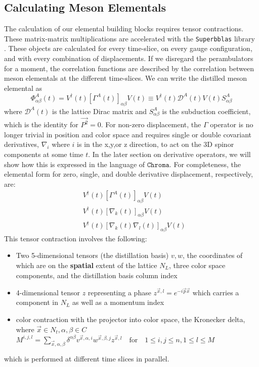 \subsection{Calculating Meson Elementals}
The calculation of our elemental building blocks requires tensor contractions. These matrix-matrix multiplications are accelerated with the \texttt{Superbblas} library \cite{dinapoli2013efficientuseblaslibrary}. These objects are calculated for every time-slice, on every gauge configuration, and with every combination of displacements. If we disregard the perambulators for a moment, the correlation functions are described by the correlation between meson elementals at the different time-slices. We can write the distilled meson elemental as 
\begin{equation}
\Phi^A_{\alpha\beta}(t) = V^{\dagger}(t) [\Gamma^A(t)]_{\alpha\beta} V(t) \equiv V^{\dagger}(t)\mathcal{D}^A(t)V(t)S^A_{\alpha\beta}
\end{equation} where $\mathcal{D}^A(t)$ is the lattice Dirac matrix and $S^A_{\alpha\beta}$ is the subduction coefficient, which is the identity for $\vec{P^2} = 0$.
For non-zero displacement, the $\Gamma$ operator is no longer trivial in position and color space and requires single or double covariant derivatives, $\nabla_i$ where $i$ is in the x,y,or z direction, to act on the 3D spinor components at some time $t$. In the later section on derivative operators, we will show how this is expressed in the language of $\texttt{Chroma}$. For completeness, the elemental form for zero, single, and double derivative displacement, respectively, are: 
\begin{eqnarray}
  & V^{\dagger}(t) [\Gamma^A(t)]_{\alpha\beta} V(t) \\ 
  & V^{\dagger}(t) [\nabla_k(t)]_{\alpha\beta} V(t) \\ 
  & V^{\dagger}(t) [\nabla_k(t)\nabla_l(t)]_{\alpha\beta} V(t)
\end{eqnarray}
This tensor contraction involves the following\cite{romero_efficient_2020}: 
\begin{itemize}
  \item Two 5-dimensional tensors (the distillation basis) $v,w$, the coordinates of which are on the \textbf{spatial} extent of the lattice $N_L$, three color space components, and the distillation basis column index 
  \item  4-dimensional tensor $z$ representing a phase $z^{\vec{x},l} = e^{-i\vec{p}\vec{x}}$ which carries a component in $N_L$ as well as a momentum index
  \item color contraction with the projector into color space, the Kronecker delta, where $\vec{x}\in N_t,\alpha,\beta \in C$
  \subitem $ M^{i,j,l} = \sum_{\vec{x},\alpha,\beta} \delta^{\alpha\beta} v^{\vec{x},\alpha,i}w^{\vec{x},\beta,j} z^{\vec{x},l} \quad \text{for} \quad 1\leq i,j \leq n, 1\leq l \leq M$ 
\end{itemize}
which is performed at different time slices in parallel. 

